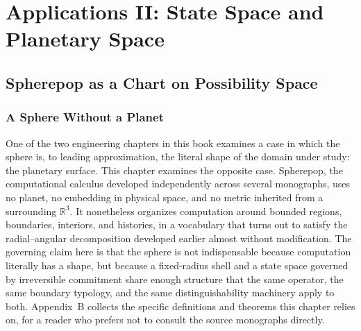 \documentclass[11pt,fleqn]{book}
\numberwithin{equation}{chapter}
\theoremstyle{plain}
\theoremstyle{definition}
\theoremstyle{remark}
\newcommand{\R}{\mathbb{R}}
\providecommand{\enquote}[1]{``#1''}
\providecommand{\scollapse}[1]{\operatorname{collapse}_{#1}}
\providecommand{\spop}[1]{\operatorname{pop}(#1)}
\providecommand{\srefuse}[1]{\operatorname{refuse}(#1)}
\providecommand{\sbind}[2]{\operatorname{bind}(#1,#2)}
\providecommand{\Pop}{\mathsf{Pop}}
\begin{document}
\part{Applications II: State Space and Planetary Space}

\providecommand{\scollapse}[1]{\operatorname{collapse}_{#1}}
\providecommand{\spop}[1]{\operatorname{pop}(#1)}
\providecommand{\srefuse}[1]{\operatorname{refuse}(#1)}
\providecommand{\sbind}[2]{\operatorname{bind}(#1,#2)}
\providecommand{\enquote}[1]{``#1''}
\providecommand{\Pop}{\mathsf{Pop}}

\chapter{Spherepop as a Chart on Possibility Space}

\section{A Sphere Without a Planet}

One of the two engineering chapters in this book examines a case in which the sphere is, to leading approximation, the literal shape of the domain under study: the planetary surface. This chapter examines the opposite case. Spherepop, the computational calculus developed independently across several monographs, uses no planet, no embedding in physical space, and no metric inherited from a surrounding \(\R^3\). It nonetheless organizes computation around bounded regions, boundaries, interiors, and histories, in a vocabulary that turns out to satisfy the radial--angular decomposition developed earlier almost without modification. The governing claim here is that the sphere is not indispensable because computation literally has a shape, but because a fixed-radius shell and a state space governed by irreversible commitment share enough structure that the same operator, the same boundary typology, and the same distinguishability machinery apply to both. Appendix~B collects the specific definitions and theorems this chapter relies on, for a reader who prefers not to consult the source monographs directly.
\end{document}
